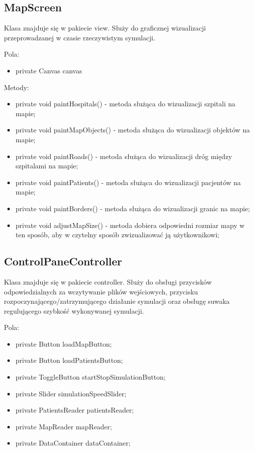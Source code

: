 \documentclass{article}
\begin{document}
    \subsection{MapScreen}
    Klasa znajduje się w pakiecie view. Służy do graficznej wizualizacji przeprowadzanej w czasie rzeczywistym symulacji.

    Pola:
    \begin{itemize}
        \item private Canvas canvas
    \end{itemize}

    Metody:
    \begin{itemize}
        \item private void paintHospitals() - metoda służąca do wizualizacji szpitali na mapie;
        \item private void paintMapObjects() - metoda służąca do wizualizacji objektów na mapie;
        \item private void paintRoads() - metoda służąca do wizualizacji dróg między szpitalami na mapie;
        \item private void paintPatients() - metoda służąca do wizualizacji pacjentów na mapie;
        \item private void paintBorders() - metoda służąca do wizualizacji granic na mapie;
        \item private void adjustMapSize() - metoda dobiera odpowiedni rozmiar mapy w ten sposób, aby w czytelny sposób zwizualizować ją użytkownikowi;
    \end{itemize}

    \subsection{ControlPaneController}
    Klasa znajduje się w pakiecie controller. Służy do obsługi przycisków odpowiedzialnych za wczytywanie plików wejściowych, przycisku rozpoczynającego/zatrzymującego działanie symulacji oraz obsługę suwaka regulującego szybkość wykonywanej symulacji.

    Pola:
    \begin{itemize}
        \item private Button loadMapButton;
        \item private Button loadPatientsButton;
        \item private ToggleButton startStopSimulationButton;
        \item private Slider simulationSpeedSlider;
        \item private PatientsReader patientsReader;
        \item private MapReader mapReader;
        \item private DataContainer dataContainer;
    \end{itemize}
\end{document}
